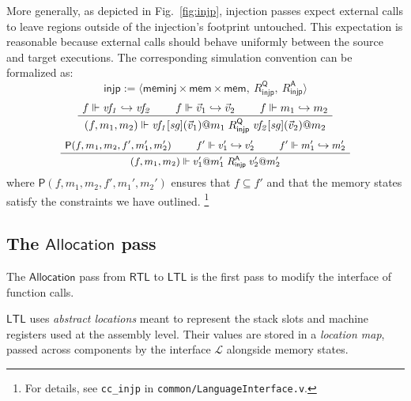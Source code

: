 \documentclass[sigplan,10pt,review,anonymous]{acmart}
\newcommand{\kw}[1]{\ensuremath{ \mathsf{#1} }}
\begin{document}
More generally,
as depicted in Fig.~\ref{fig:injp},
injection passes expect external calls
to leave regions outside of the injection's footprint untouched.
This expectation is reasonable because
external calls
should behave uniformly between the source and target executions.
The corresponding simulation convention
can be formalized as:
\[
  \kw{injp} :=
    \langle
      \kw{meminj} \times \kw{mem} \times \kw{mem}, \:
      R_\kw{injp}^\kw{Q}, \:
      R_\kw{injp}^\kw{A}
    \rangle
\]
\[
  \AxiomC{$f \Vdash \mathit{vf_1} \hookrightarrow \mathit{vf_2}$}
  \AxiomC{$f \Vdash \vec{v}_1 \hookrightarrow \vec{v}_2$}
  \AxiomC{$f \Vdash m_1 \hookrightarrow m_2$}
  \TrinaryInfC{$(f, m_1, m_2) \Vdash
    \mathit{vf_1}[\mathit{sg}](\vec{v}_1)@m_1
    \mathrel{R_\kw{injp}^\kw{Q}}
    \mathit{vf_2}[\mathit{sg}](\vec{v}_2)@m_2$}
  \DisplayProof
\]
\[
  \small
  \AxiomC{$\kw{P}(f, m_1, m_2, f', m_1', m_2')$}
  \AxiomC{$f' \Vdash v_1' \hookrightarrow v_2'$}
  \AxiomC{$f' \Vdash m_1' \hookrightarrow m_2'$}
  \TrinaryInfC{$(f, m_1, m_2) \Vdash
    v_1'@m_1'
    \mathrel{R_\kw{injp}^\kw{A}}
    v_2'@m_2'$}
  \DisplayProof
\]
where $\kw{P}(f, m_1, m_2, f', m_1', m_2')$
ensures that $f \subseteq f'$ and that the memory states
satisfy the constraints we have outlined.%
\footnote{For details,
  see \texttt{cc\_injp} in \texttt{common/LanguageInterface.v}.}


\subsection{The \kw{Allocation} pass} %

The \kw{Allocation} pass from \kw{RTL} to \kw{LTL}
is the first pass to modify the interface of function calls.

\kw{LTL} uses \emph{abstract locations}
meant to represent the stack slots and machine registers
used at the assembly level.
Their values are stored in a \emph{location map},
passed across components by the interface $\mathcal{L}$
alongside memory states.
\end{document}

